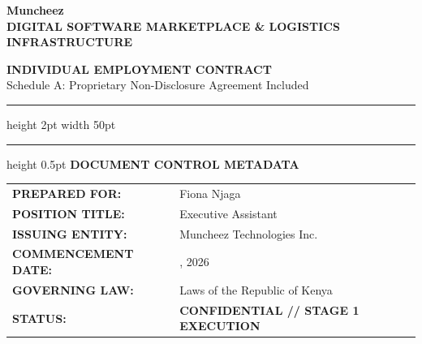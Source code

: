 \documentclass[11pt,a4paper]{article}
\begin{document}
\thispagestyle{empty}

\vspace*{1.5cm}

\begin{raggedright}
    {\fontsize{36}{42}\sffamily\bfseries\color{SolidBlack} Muncheez} \\[0.3cm]
    {\textsf{\small\bfseries\color{SolidBlack} DIGITAL SOFTWARE MARKETPLACE \& LOGISTICS INFRASTRUCTURE}}
\end{raggedright}

\vspace{3.5cm}

\begin{raggedright}
    {\fontsize{24}{28}\sffamily\bfseries\color{SolidBlack} INDIVIDUAL EMPLOYMENT CONTRACT}\\[0.2cm]
    {\fontsize{12}{15}\sffamily\color{SolidBlack} Schedule A: Proprietary Non-Disclosure Agreement Included}\\[0.4cm]
    {\color{LinkBlue}\hrule height 2pt width 50pt}
\end{raggedright}

\vfill

\begin{raggedright}
    \color{SolidBlack}\hrule height 0.5pt
    \vspace{0.4cm}
    \textsf{\scriptsize\color{SolidBlack}\textbf{DOCUMENT CONTROL METADATA}}\\[0.3cm]
    \begin{tabular}{@{}p{3.8cm} p{8.5cm}@{}}
        \textsf{\small\bfseries\color{SolidBlack} PREPARED FOR:} & \textsf{\small\color{SolidBlack} Fiona Njaga} \\[0.15cm]
        \textsf{\small\bfseries\color{SolidBlack} POSITION TITLE:} & \textsf{\small\color{SolidBlack} Executive Assistant} \\[0.15cm]
        \textsf{\small\bfseries\color{SolidBlack} ISSUING ENTITY:} & \textsf{\small\color{SolidBlack} Muncheez Technologies Inc.} \\[0.15cm]
        \textsf{\small\bfseries\color{SolidBlack} COMMENCEMENT DATE:} & \textsf{\small\color{SolidBlack} \underline{\hspace{3.0cm}}, 2026} \\[0.15cm]
        \textsf{\small\bfseries\color{SolidBlack} GOVERNING LAW:} & \textsf{\small\color{SolidBlack} Laws of the Republic of Kenya} \\[0.15cm]
        \textsf{\small\bfseries\color{SolidBlack} STATUS:} & \textsf{\small\color{SolidBlack}\textbf{CONFIDENTIAL // STAGE 1 EXECUTION}} \\
    \end{tabular}
\end{raggedright}
\end{document}
